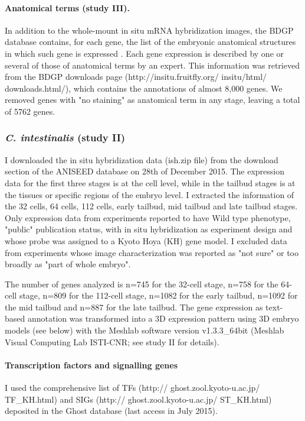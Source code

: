 \paragraph{Anatomical terms (study III).}
In addition to the whole-mount in situ mRNA hybridization images, the BDGP database contains, for each gene, the list of the embryonic anatomical structures in which such gene is expressed \citep{Tomancak2007}. Each gene expression is described by one or several of those of anatomical terms by an expert. 
This information was retrieved from the BDGP downloads page (http://insitu.fruitfly.org/ insitu/html/ downloads.html/), which contains the annotations of almost 8,000 genes. We removed genes with "no staining" as anatomical term in any stage, leaving a total of 5762 genes.

\subsubsection{\textit{C. intestinalis} (study II)}

I downloaded the in situ hybridization data (ish.zip file) from the download section of the ANISEED database on 28th of December 2015. 
The expression data for the first three stages is at the cell level, while in the tailbud stages is at the tissues or specific regions of the embryo level. 
I extracted the information of the 32 cells, 64 cells, 112 cells, early tailbud, mid tailbud and late tailbud stages. Only expression data from experiments reported to have Wild type phenotype, "public" publication status, with in situ hybridization as experiment design and whose probe was assigned to a Kyoto Hoya (KH) \citep{Satou2008} gene model.
I excluded data from experiments whose image characterization was reported as "not sure" or too broadly as "part of whole embryo".

The number of genes analyzed is n=745 for the 32-cell stage, n=758 for the 64-cell stage, n=809 for the 112-cell stage, n=1082 for the early tailbud, n=1092 for the mid tailbud and n=887 for the late tailbud. 
The gene expression as text-based annotation was transformed into a 3D expression pattern using 3D embryo models (see below) with the Meshlab software version v1.3.3\_64bit (Meshlab Visual Computing Lab ISTI-CNR; see study II for details).

\paragraph{Transcription factors and signalling genes}
I used the comprehensive list of TFs (http:// ghost.zool.kyoto-u.ac.jp/ TF\_KH.html) and SIGs (http:// ghost.zool.kyoto-u.ac.jp/ ST\_KH.html) deposited in the Ghost database (last access in July 2015).
 
